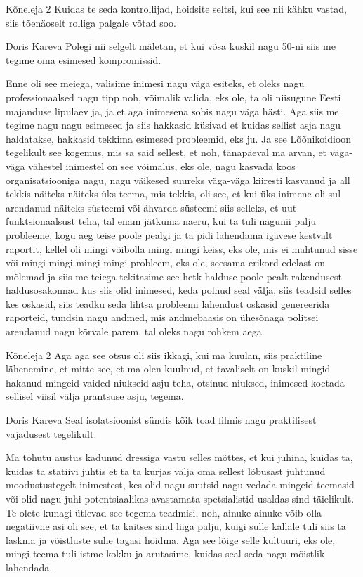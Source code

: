 Kõneleja 2
Kuidas te seda kontrollijad, hoidsite seltsi, kui see nii kähku vastad, siis tõenäoselt rolliga palgale võtad soo. 

Doris Kareva
Polegi nii selgelt mäletan, et kui võsa kuskil nagu 50-ni siis me tegime oma esimesed kompromissid. 

Enne oli see meiega, valisime inimesi nagu väga esiteks, et oleks nagu professionaalsed nagu tipp noh, võimalik valida, eks ole, ta oli niisugune Eesti majanduse lipulaev ja, ja et aga inimesena sobis nagu väga hästi. Aga siis me tegime nagu nagu esimesed ja siis hakkasid küsivad et kuidas sellist asja nagu haldatakse, hakkasid tekkima esimesed probleemid, eks ju. Ja see Lõõnikoidioon tegelikult see kogemus, mis sa said sellest, et noh, tänapäeval ma arvan, et väga-väga vähestel inimestel on see võimalus, eks ole, nagu kasvada koos organisatsiooniga nagu, nagu väikesed suureks väga-väga kiiresti kasvanud ja all tekkis näiteks näiteks üks teema, mis tekkis, oli see, et kui üks inimene oli sul arendanud näiteks süsteemi või ähvarda süsteemi siis selleks, et uut funktsionaalsust teha, tal enam jätkuma naeru, kui ta tuli nagunii palju probleeme, kogu aeg teise poole pealgi ja ta pidi lahendama igavese kestvalt raportit, kellel oli mingi võibolla mingi mingi keiss, eks ole, mis ei mahtunud sisse või mingi mingi mingi mingi probleem, eks ole, seesama erikord edelast on mõlemad ja siis me teiega tekitasime see hetk halduse poole pealt rakendusest haldusosakonnad kus siis olid inimesed, keda polnud seal välja, siis teadsid selles kes oskasid, siis teadku seda lihtsa probleemi lahendust oskasid genereerida raporteid, tundsin nagu andmed, mis andmebaasis on ühesõnaga politsei arendanud nagu kõrvale parem, tal oleks nagu rohkem aega. 

Kõneleja 2
Aga aga see otsus oli siis ikkagi, kui ma kuulan, siis praktiline lähenemine, et mitte see, et ma olen kuulnud, et tavaliselt on kuskil mingid hakanud mingeid vaided niukseid asju teha, otsinud niuksed, inimesed koetada sellisel viisil välja prantsuse asju, tegema. 

Doris Kareva
Seal isolatsioonist sündis kõik toad filmis nagu praktilisest vajadusest tegelikult. 

Ma tohutu austus kadunud dressiga vastu selles mõttes, et kui juhina, kuidas ta, kuidas ta statiivi juhtis et ta ta kurjas välja oma sellest lõbusast juhtunud moodustustegelt inimestest, kes olid nagu suutsid nagu vedada mingeid teemasid või olid nagu juhi potentsiaalikas avastamata spetsialistid usaldas sind täielikult. Te olete kunagi ütlevad see tegema teadmisi, noh, ainuke ainuke võib olla negatiivne asi oli see, et ta kaitses sind liiga palju, kuigi sulle kallale tuli siis ta laskma ja võistluste suhe tagasi hoidma. Aga see lõige selle kultuuri, eks ole, mingi teema tuli istme kokku ja arutasime, kuidas seal seda nagu mõistlik lahendada. 

